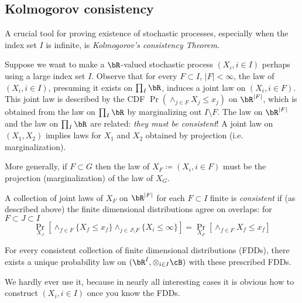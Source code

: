
\subsection{Kolmogorov consistency}

A crucial tool for proving existence of stochastic processes,
especially when the index set $I$ is infinite,
is \emph{Kolmogorov's consistency Theorem}.

Suppose we want to make a $\bR$-valued stochastic process
$(X_i, i \in I)$ perhaps using a large index set $I$.
Observe that for every $F \subset I$, $\lvert F \rvert < \infty$,
the law of $(X_i, i \in I)$, presuming it exists on $\prod_{I} \bR$,
induces a joint law on $(X_i, i \in F)$.
This joint law is described by the CDF $\Pr(\land_{j \in F} X_{j} \leq x_j)$
on $\bR^{\lvert F \rvert}$, which is obtained from the law on $\prod_I \bR$ by
marginalizing out $I \setminus F$.
The law on $\bR^{\lvert F \rvert}$ and the law on $\prod_I \bR$ are related:
\emph{they must be consistent}! A joint law on $(X_1, X_2)$ implies
laws for $X_1$ and $X_2$ obtained by projection (i.e. marginalization).

More generally, if $F \subset G$ then the law of $X_F \coloneqq (X_i, i \in F)$
must be the projection (marginalization) of the law of $X_G$.

\begin{definition}
  A collection of joint laws of $X_F$ on $\bR^{\lvert F \rvert}$ for each
  $F \subset I$ finite is \emph{consistent} if (as described above)
  the finite dimensional distributions agree on overlaps:
  for $F \subset J \subset I$
  \[
    \Pr_{X_J}[\land_{f \in F} \{X_f \leq x_f\} \land_{j \in J \setminus F} \{X_i \leq \infty\} ]
    = \Pr_{X_F}[\land_{f \in F} X_f \leq x_f]
  \]
\end{definition}

\begin{theorem}[Kolmogorov]
  For every consistent collection of finite dimensional distributions (FDDs),
  there exists a unique probability law on $(\bR^I, \otimes_{i \in I} \cB)$ with these
  prescribed FDDs.
\end{theorem}

\begin{remark}
  We hardly ever use it, because in nearly all interesting cases it is obvious
  how to construct $(X_i, i \in I)$ once you know the FDDs.
\end{remark}

